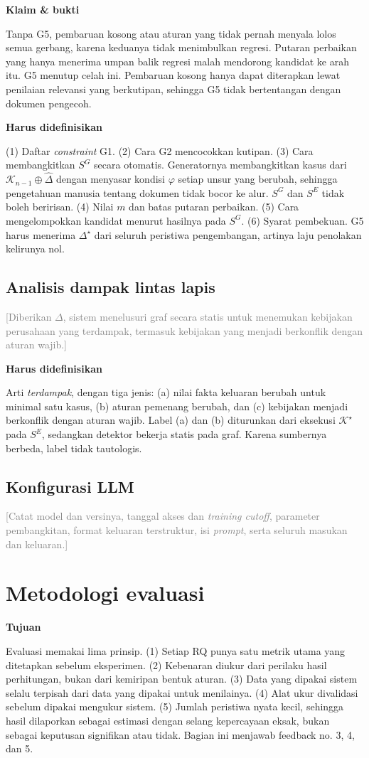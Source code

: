 \documentclass[journal,a4paper]{IEEEtran}
\newcommand{\en}[1]{\textit{#1}}
\newcommand{\K}{\mathcal{K}}
\newcommand{\emas}{\star}
\newcommand{\SG}{S^{G}}
\newcommand{\SE}{S^{E}}
\newif\ifrancangan \rancangantrue
\newcommand{\kotak}[3]{\ifrancangan\par\begingroup\scriptsize
  \def\FrameCommand{\fboxsep=3pt\fboxrule=0.4pt\fcolorbox{#1!60!black}{#1!6}}%
  \MakeFramed{\advance\hsize-\width\FrameRestore}\noindent\textbf{#2}\par #3\endMakeFramed\endgroup\fi}
\newcommand{\tujuan}[1]{\kotak{blue}{Tujuan}{#1}}
\newcommand{\definisikan}[1]{\kotak{teal}{Harus didefinisikan}{#1}}
\newcommand{\klaim}[1]{\kotak{green}{Klaim \& bukti}{#1}}
\newcommand{\isian}[1]{\ifrancangan\textcolor{gray}{[#1]}\fi}
\begin{document}
\klaim{Tanpa G5, pembaruan kosong atau aturan yang tidak pernah menyala lolos semua gerbang, karena keduanya tidak menimbulkan regresi. Putaran perbaikan yang hanya menerima umpan balik regresi malah mendorong kandidat ke arah itu. G5 menutup celah ini. Pembaruan kosong hanya dapat diterapkan lewat penilaian relevansi yang berkutipan, sehingga G5 tidak bertentangan dengan dokumen pengecoh.}

\definisikan{(1) Daftar \en{constraint} G1. (2) Cara G2 mencocokkan kutipan. (3) Cara membangkitkan $\SG$ secara otomatis. Generatornya membangkitkan kasus dari $\K_{n-1} \oplus \hat{\Delta}$ dengan menyasar kondisi $\varphi$ setiap unsur yang berubah, sehingga pengetahuan manusia tentang dokumen tidak bocor ke alur. $\SG$ dan $\SE$ tidak boleh beririsan. (4) Nilai $m$ dan batas putaran perbaikan. (5) Cara mengelompokkan kandidat menurut hasilnya pada $\SG$. (6) Syarat pembekuan. G5 harus menerima $\Delta^{\emas}$ dari seluruh peristiwa pengembangan, artinya laju penolakan kelirunya nol.}

\subsection{Analisis dampak lintas lapis}
\isian{Diberikan $\Delta$, sistem menelusuri graf secara statis untuk menemukan kebijakan perusahaan yang terdampak, termasuk kebijakan yang menjadi berkonflik dengan aturan wajib.}

\definisikan{Arti \emph{terdampak}, dengan tiga jenis: (a) nilai fakta keluaran berubah untuk minimal satu kasus, (b) aturan pemenang berubah, dan (c) kebijakan menjadi berkonflik dengan aturan wajib. Label (a) dan (b) diturunkan dari eksekusi $\K^{\emas}$ pada $\SE$, sedangkan detektor bekerja statis pada graf. Karena sumbernya berbeda, label tidak tautologis.}

\subsection{Konfigurasi LLM}
\isian{Catat model dan versinya, tanggal akses dan \en{training cutoff}, parameter pembangkitan, format keluaran terstruktur, isi \en{prompt}, serta seluruh masukan dan keluaran.}

\section{Metodologi evaluasi}
\label{sec:evaluasi}
\tujuan{Evaluasi memakai lima prinsip. (1) Setiap RQ punya satu metrik utama yang ditetapkan sebelum eksperimen. (2) Kebenaran diukur dari perilaku hasil perhitungan, bukan dari kemiripan bentuk aturan. (3) Data yang dipakai sistem selalu terpisah dari data yang dipakai untuk menilainya. (4) Alat ukur divalidasi sebelum dipakai mengukur sistem. (5) Jumlah peristiwa nyata kecil, sehingga hasil dilaporkan sebagai estimasi dengan selang kepercayaan eksak, bukan sebagai keputusan signifikan atau tidak. Bagian ini menjawab feedback no. 3, 4, dan 5.}
\end{document}
